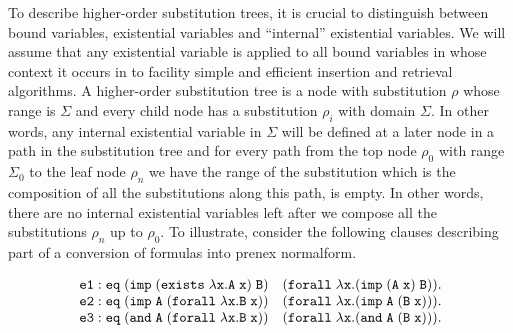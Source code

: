 \documentclass{llncs}
\newcommand{\typeLF}{\tt{type}}
\newcommand{\propLF}{\tt{prop}}
\newcommand{\andLF}{\tt{and}\;}
\newcommand{\impLF}{\tt{imp}\;}
\newcommand{\forallLF}{\tt{forall}\;}
\newcommand{\existsLF}{\tt{exists}\;}
\newcommand{\eqLF}{\tt{eq}\;}
\newcommand{\eqilLF}{\tt{e1}}
\newcommand{\eqirLF}{\tt{e2}}
\newcommand{\eqalLF}{\tt{e3}}
\begin{document}
To describe higher-order substitution trees, it is crucial to
distinguish between bound variables, existential variables and
``internal'' existential variables. We will assume that any
existential variable is applied to all bound variables in whose
context it occurs in to facility simple and efficient insertion and
retrieval algorithms. A higher-order substitution tree is a node with
substitution $\rho$ whose range is $\Sigma$ and every child node has a
substitution $\rho_i$ with domain $\Sigma$. In other words, any
internal existential variable in $\Sigma$ will be defined at a later
node in a path in the substitution tree and for every path
from the top node $\rho_0$ with range $\Sigma_0$ to the leaf node
$\rho_n$ we have the range of the substitution which is the
composition of all the substitutions along this path, is empty. In
other words, there are no internal existential variables left after we
compose all the substitutions $\rho_n$ up to $\rho_0$. 
%
To illustrate, consider the following clauses describing part of a
conversion of formulas into prenex normalform. 

\begin{small}
\[
\begin{array}{l}
%
\eqilLF: \eqLF (\impLF (\existsLF \lambda x. A\; x)\; B)\quad (\forallLF \lambda x. (\impLF (A\; x)\; B)).\\
\eqirLF: \eqLF (\impLF A\; (\forallLF \lambda x. B\;x)) \quad (\forallLF \lambda x. (\impLF A \; (B\; x))).\\
\eqalLF: \eqLF (\andLF A \; (\forallLF \lambda x. B\; x)) \quad (\forallLF \lambda x. (\andLF A \; (B\;x))).\\
\end{array}
\]
\end{small}
\end{document}
